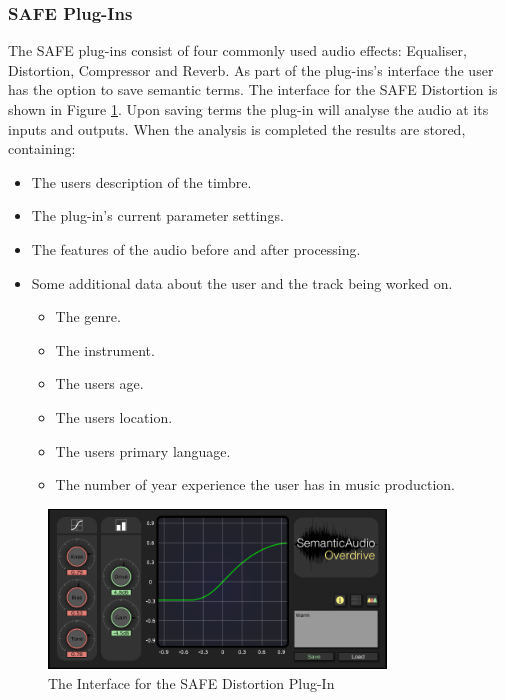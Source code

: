 		\subsubsection{SAFE Plug-Ins}
			The SAFE plug-ins consist of four commonly used audio effects: Equaliser, Distortion, Compressor and
			Reverb. As part of the plug-ins's interface the user has the option to save semantic terms. The
			interface for the SAFE Distortion is shown in Figure \ref{fig:SAFE-Distortion}. Upon saving terms
			the plug-in will analyse the audio at its inputs and outputs. When the analysis is completed the
			results are stored, containing:

			\begin{itemize}
				\item The users description of the timbre.
				\item The plug-in's current parameter settings.
				\item The features of the audio before and after processing.
				\item Some additional data about the user and the track being worked on.
				\begin{itemize}
					\item The genre.
					\item The instrument.
					\item The users age.
					\item The users location.
					\item The users primary language.
					\item The number of year experience the user has in music production.
				\end{itemize}
			\end{itemize}

			\begin{figure}[h!]
				\centering
				\includegraphics[width=0.8\textwidth]{chapter5/Images/SAFEDistortion.png}
				\caption{The Interface for the SAFE Distortion Plug-In}
				\label{fig:SAFE-Distortion}
			\end{figure}

